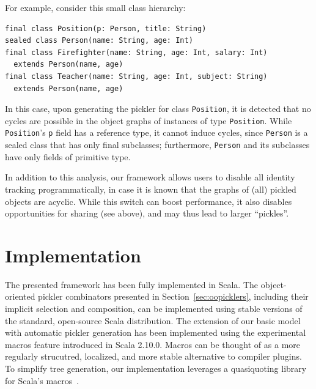 \documentclass[preprint,10pt]{sigplanconf}
\theoremstyle{definition}
\theoremstyle{definition}
\begin{document}
For example, consider this small class hierarchy:

\begin{lstlisting}
final class Position(p: Person, title: String)
sealed class Person(name: String, age: Int)
final class Firefighter(name: String, age: Int, salary: Int)
  extends Person(name, age)
final class Teacher(name: String, age: Int, subject: String)
  extends Person(name, age)
\end{lstlisting}

In this case, upon generating the pickler for class \verb|Position|, it is
detected that no cycles are possible in the object graphs of instances of type
\verb|Position|. While \verb|Position|'s \verb|p| field has a reference type,
it cannot induce cycles, since \verb|Person| is a sealed class that has only
final subclasses; furthermore, \verb|Person| and its subclasses have only
fields of primitive type.

In addition to this analysis, our framework allows users to disable all
identity tracking programmatically, in case it is known that the graphs of
(all) pickled objects are acyclic. While this switch can boost performance, it
also disables opportunities for sharing (see above), and may thus lead to
larger ``pickles''.



\section{Implementation}

The presented framework has been fully implemented in Scala.
The object-oriented pickler combinators presented in
Section~\ref{sec:oopicklers}, including their implicit selection and
composition, can be implemented using stable versions of the standard, open-source
Scala distribution. The extension of our basic model with
automatic pickler generation has been implemented using the experimental
macros feature introduced in Scala 2.10.0. Macros can be thought of as a
more regularly strucutred, localized, and more stable alternative to compiler
plugins. To simplify tree generation, our implementation leverages a
quasiquoting library for Scala's macros~\cite{Quasiquotes}.



\end{document}
